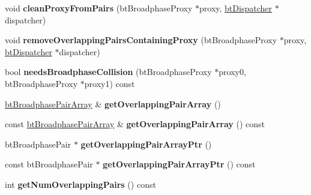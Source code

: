 \begin{DoxyCompactItemize}
\mbox{\label{classbtSortedOverlappingPairCache_acf542ec63da3047a2e9e04cb03d6bfe8}} 
void {\bfseries clean\+Proxy\+From\+Pairs} (bt\+Broadphase\+Proxy $\ast$proxy, \hyperlink{classbtDispatcher}{bt\+Dispatcher} $\ast$dispatcher)
\item 
\mbox{\label{classbtSortedOverlappingPairCache_a77a9dc74c2250b05524b6c20d969bb68}} 
void {\bfseries remove\+Overlapping\+Pairs\+Containing\+Proxy} (bt\+Broadphase\+Proxy $\ast$proxy, \hyperlink{classbtDispatcher}{bt\+Dispatcher} $\ast$dispatcher)
\item 
\mbox{\label{classbtSortedOverlappingPairCache_a77493e0dd75457eb30638bc636028b44}} 
bool {\bfseries needs\+Broadphase\+Collision} (bt\+Broadphase\+Proxy $\ast$proxy0, bt\+Broadphase\+Proxy $\ast$proxy1) const
\item 
\mbox{\label{classbtSortedOverlappingPairCache_ae71e7fdb0e6bc39334d960a645cc1042}} 
\hyperlink{classbtAlignedObjectArray}{bt\+Broadphase\+Pair\+Array} \& {\bfseries get\+Overlapping\+Pair\+Array} ()
\item 
\mbox{\label{classbtSortedOverlappingPairCache_afaf36ce10a54a530489c673bfd480fa7}} 
const \hyperlink{classbtAlignedObjectArray}{bt\+Broadphase\+Pair\+Array} \& {\bfseries get\+Overlapping\+Pair\+Array} () const
\item 
\mbox{\label{classbtSortedOverlappingPairCache_a11d3a6e1e0ffacc51fb8d803d3b12f83}} 
bt\+Broadphase\+Pair $\ast$ {\bfseries get\+Overlapping\+Pair\+Array\+Ptr} ()
\item 
\mbox{\label{classbtSortedOverlappingPairCache_a9d41b216956d21c0ea31e426aa34714d}} 
const bt\+Broadphase\+Pair $\ast$ {\bfseries get\+Overlapping\+Pair\+Array\+Ptr} () const
\item 
\mbox{\label{classbtSortedOverlappingPairCache_a796553ee8202c158adc57e3dfecff0a8}} 
int {\bfseries get\+Num\+Overlapping\+Pairs} () const
\item 
\mbox{\label{classbtSortedOverlappingPairCache_ac31e0bde69f0464519ae7753274681c6}} 

\end{DoxyCompactItemize}
